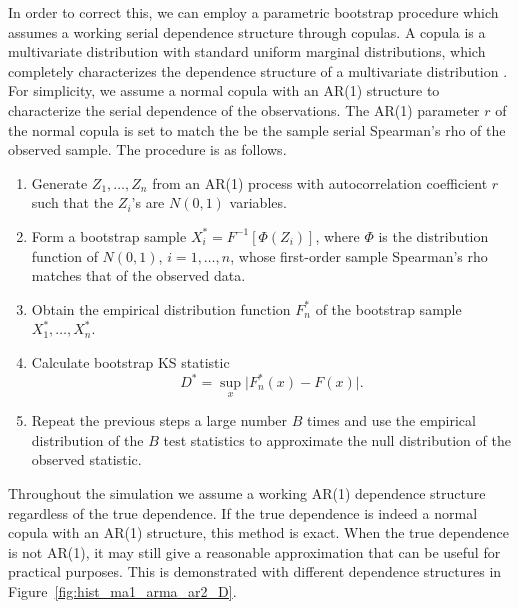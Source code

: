 \documentclass[12pt, letterpaper, titlepage]{article}
\begin{document}
In order to correct this, we can employ a parametric bootstrap procedure which
assumes a working serial dependence structure through copulas. A copula is a
multivariate distribution with standard uniform marginal distributions, which
completely characterizes the dependence structure of a multivariate
distribution \citep{Copula, Hofert}. For simplicity, we assume a normal copula 
with an AR(1) structure to characterize the serial dependence of the 
observations. The AR(1) parameter $r$ of the normal copula is set to match the be 
the sample serial Spearman's rho of the observed sample. The procedure is as 
follows.
  
\begin{enumerate}
\item
  Generate $Z_1, \ldots, Z_n$ from an AR(1) process with autocorrelation
  coefficient $r$ such that the $Z_i$'s are $N(0, 1)$ variables.
\item
  Form a bootstrap sample $X_i^* = F^{-1} [\Phi(Z_i)]$, where $\Phi$ is the
  distribution function of $N(0, 1)$, 
  $i = 1, \ldots, n$, whose first-order sample Spearman's rho matches that of
  the observed data.
\item
  Obtain the empirical distribution function $F_n^*$ of the bootstrap sample
  $X_1^*, \ldots, X_n^*$.
\item 
  Calculate bootstrap KS statistic
  \[
    D^* = \sup_x \lvert F_n^* (x)- F(x) \rvert.
  \]
\item
  Repeat the previous steps a large number $B$ times and use the empirical
    distribution of the $B$ test statistics to approximate
    the null distribution of the observed statistic.      
\end{enumerate}

Throughout the simulation we assume a working AR(1) dependence structure 
regardless of the true dependence. If the true dependence is indeed a normal 
copula with an AR(1) structure, this method is exact. When the true dependence 
is not AR(1), it may still give a reasonable approximation that can be useful 
for practical purposes. This is demonstrated with different dependence 
structures in Figure~\ref{fig:hist_ma1_arma_ar2_D}.
\end{document}
